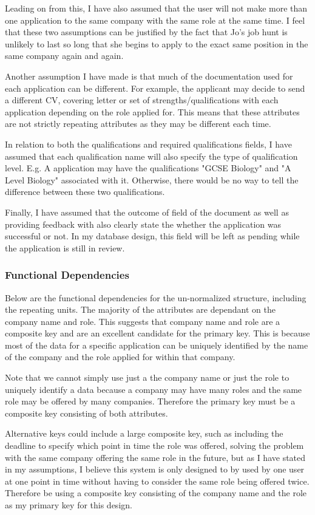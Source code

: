 \documentclass{article}
\begin{document}
Leading on from this, I have also assumed that the user will not make more than one application to the same company with the same role at the same time. I feel that these two assumptions can be justified by the fact that Jo's job hunt is unlikely to last so long that she begins to apply to the exact same position in the same company again and again.

Another assumption I have made is that much of the documentation used for each application can be different. For example, the applicant may decide to send a different CV, covering letter or set of strengths/qualifications with each application depending on the role applied for. This means that these attributes are not strictly repeating attributes as they may be different each time.

In relation to both the qualifications and required qualifications fields, I have assumed that each qualification name will also specify the type of qualification level. E.g. A application may have the qualifications "GCSE Biology" and "A Level Biology" associated with it. Otherwise, there would be no way to tell the difference between these two qualifications.

Finally, I have assumed that the outcome of field of the document as well as providing feedback with also clearly state the whether the application was successful or not. In my database design, this field will be left as pending while the application is still in review.

\subsubsection{Functional Dependencies}
\label{sec:func}
Below are the functional dependencies for the un-normalized structure, including the repeating units. The majority of the attributes are dependant on the company name and role. This suggests that company name and role are a composite key and are an excellent candidate for the primary key. This is because most of the data for a specific application can be uniquely identified by the name of the company and the role applied for within that company. 

Note that we cannot simply use just a the company name or just the role to uniquely identify a data because a company may have many roles and the same role may be offered by many companies. Therefore the primary key must be a composite key consisting of both attributes. 

Alternative keys could include a large composite key, such as including the deadline to specify which point in time the role was offered, solving the problem with the same company offering the same role in the future, but as I have stated in my assumptions, I believe this system is only designed to by used by one user at one point in time without having to consider the same role being offered twice. Therefore be using a composite key consisting of the company name and the role as my primary key for this design.
\end{document}
